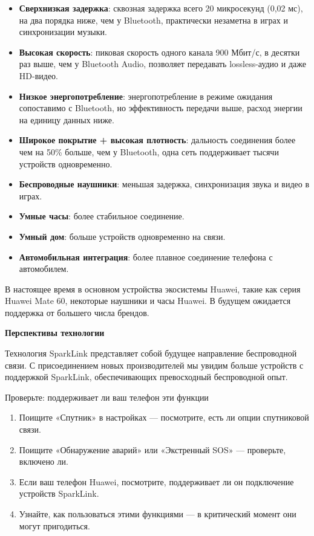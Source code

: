 
\begin{itemize}
  \item \textbf{Сверхнизкая задержка}: сквозная задержка всего 20 микросекунд (0,02 мс), на два порядка ниже, чем у Bluetooth, практически незаметна в играх и синхронизации музыки.
  \item \textbf{Высокая скорость}: пиковая скорость одного канала 900 Мбит/с, в десятки раз выше, чем у Bluetooth Audio, позволяет передавать lossless-аудио и даже HD-видео.
  \item \textbf{Низкое энергопотребление}: энергопотребление в режиме ожидания сопоставимо с Bluetooth, но эффективность передачи выше, расход энергии на единицу данных ниже.
  \item \textbf{Широкое покрытие + высокая плотность}: дальность соединения более чем на 50\% больше, чем у Bluetooth, одна сеть поддерживает тысячи устройств одновременно.
\end{itemize}


\begin{itemize}
  \item \textbf{Беспроводные наушники}: меньшая задержка, синхронизация звука и видео в играх.
  \item \textbf{Умные часы}: более стабильное соединение.
  \item \textbf{Умный дом}: больше устройств одновременно на связи.
  \item \textbf{Автомобильная интеграция}: более плавное соединение телефона с автомобилем.
\end{itemize}


В настоящее время в основном устройства экосистемы Huawei, такие как серия Huawei Mate 60, некоторые наушники и часы Huawei. В будущем ожидается поддержка от большего числа брендов.

\textbf{Перспективы технологии}\par

Технология SparkLink представляет собой будущее направление беспроводной связи. С присоединением новых производителей мы увидим больше устройств с поддержкой SparkLink, обеспечивающих превосходный беспроводной опыт.

\begin{tcbpractice}{Проверьте: поддерживает ли ваш телефон эти функции}
\begin{enumerate}
  \item Поищите «Спутник» в настройках — посмотрите, есть ли опции спутниковой связи.
  \item Поищите «Обнаружение аварий» или «Экстренный SOS» — проверьте, включено ли.
  \item Если ваш телефон Huawei, посмотрите, поддерживает ли он подключение устройств SparkLink.
  \item Узнайте, как пользоваться этими функциями — в критический момент они могут пригодиться.
\end{enumerate}

\end{tcbpractice}
